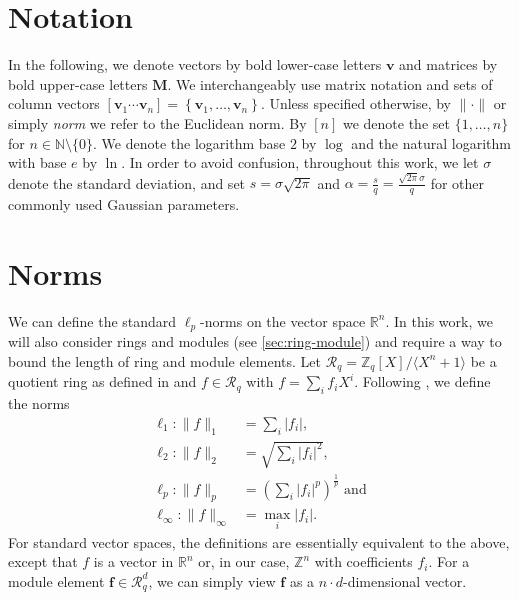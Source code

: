 


\section{Notation}
In the following, we denote vectors by bold lower-case letters $\mathbf{v}$ and matrices by bold upper-case letters $\mathbf{M}$. We interchangeably use matrix notation and sets of column vectors $\left[\mathbf{v}_1 \cdots \mathbf{v}_n\right] = \left\{\mathbf{v}_1, \dots, \mathbf{v}_n\right\}$. Unless specified otherwise, by $\| \cdot \|$ or simply \textit{norm} we refer to the Euclidean norm. By $[n]$ we denote the set $\{1, \dots, n\}$ for $n\in \mathbb{N} \setminus \{0\}$. We denote the logarithm base $2$ by $\log$ and the natural logarithm with base $e$ by $\ln$. In order to avoid confusion, throughout this work, we let $\sigma$ denote the standard deviation, and set $s =\sigma \sqrt{2 \pi}$ and $\alpha = \frac{s}{q} = \frac{\sqrt{2\pi} \sigma}{q}$ for other commonly used Gaussian parameters.

\section{Norms}\label{sec:norms}
We can define the standard $\ell_p$-norms on the vector space $\mathbb{R}^n$. In this work, we will also consider rings and modules (see \cref{sec:ring-module}) and require a way to bound the length of ring and module elements. Let $\mathcal{R}_q=\mathbb{Z}_q[X]/\langle X^n + 1 \rangle$ be a quotient ring as defined in \cite{BDLOP18} and $f \in \mathcal{R}_q$ with $f = \sum_i f_i X^i$. Following \cite{BDLOP18}, we define the norms
\begin{equation}
    \begin{aligned}
        \ell_1 : \| f \|_1           & = \sum_i |f_i|,                                         \\
        \ell_2 : \| f \|_2           & = \sqrt{\sum_i |f_i|^2},                                \\
        \ell_p : \| f \|_p           & = \left(\sum_i |f_i|^p\right)^{\frac{1}{p}} \text{ and} \\
        \ell_\infty : \| f \|_\infty & = \max_i |f_i|.
    \end{aligned}
\end{equation}
For standard vector spaces, the definitions are essentially equivalent to the above, except that $f$ is a vector in $\mathbb{R}^n$ or, in our case, $\mathbb{Z}^n$ with coefficients $f_i$. For a module element $\mathbf{f} \in \mathcal{R}_q^d$, we can simply view $\mathbf{f}$ as a $n\cdot d$-dimensional vector.

